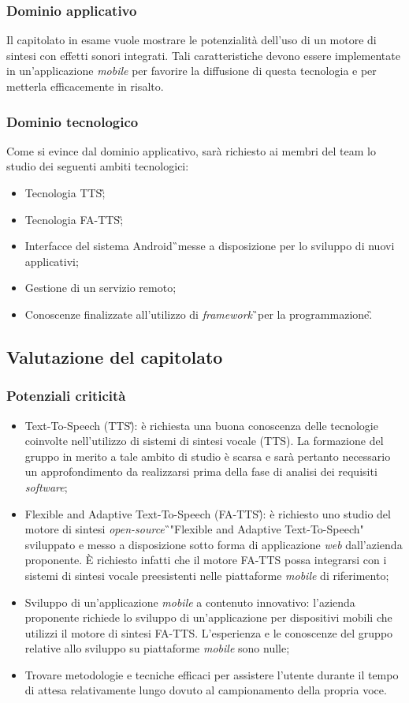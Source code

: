 \subsubsection{Dominio applicativo}
Il capitolato in esame vuole mostrare le potenzialità dell'uso di un motore di sintesi con effetti sonori integrati. Tali caratteristiche devono essere implementate in un'applicazione \textit{mobile} per favorire la diffusione di questa tecnologia e per metterla efficacemente in risalto.

\subsubsection{Dominio tecnologico}
Come si evince dal dominio applicativo, sarà richiesto ai membri del team lo studio dei seguenti ambiti tecnologici:
\begin{itemize}
\item Tecnologia TTS\G;
\item Tecnologia FA-TTS\G;
\item Interfacce del sistema Android\G\ messe a disposizione per lo sviluppo di nuovi applicativi;
\item Gestione di un servizio remoto;
\item Conoscenze finalizzate all'utilizzo di \textit{framework}\G\ per la 
programmazione\G.
\end{itemize}

\subsection{Valutazione del capitolato}
\subsubsection{Potenziali criticità}
\begin{itemize}
\item Text-To-Speech (TTS\G): è richiesta una buona conoscenza delle tecnologie coinvolte nell'utilizzo di sistemi di sintesi vocale (TTS). La formazione del gruppo in merito a tale ambito di studio è scarsa e sarà pertanto necessario un approfondimento da realizzarsi prima della fase di analisi dei requisiti \textit{software};
\item Flexible and Adaptive Text-To-Speech (FA-TTS\G): è richiesto uno studio 
del motore di sintesi \textit{open-source}\G\ "Flexible and Adaptive 
Text-To-Speech" sviluppato e messo a disposizione  sotto forma di applicazione 
\textit{web} dall'azienda proponente. È richiesto infatti che il motore 
FA-TTS possa integrarsi con i sistemi di sintesi vocale preesistenti nelle 
piattaforme \textit{mobile} di riferimento;
\item Sviluppo di un'applicazione \textit{mobile} a contenuto innovativo: l'azienda proponente richiede lo sviluppo di un'applicazione per dispositivi mobili che utilizzi il motore di sintesi FA-TTS. L'esperienza e le conoscenze del gruppo relative allo sviluppo su piattaforme \textit{mobile} sono nulle;
\item Trovare metodologie e tecniche efficaci per assistere l'utente durante il 
tempo di attesa relativamente lungo dovuto al campionamento della propria voce.
\end{itemize}

